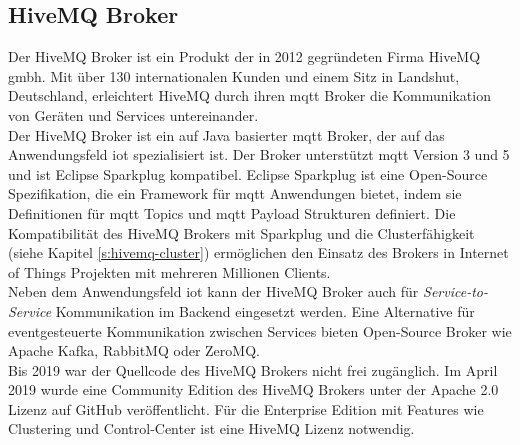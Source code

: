 \newpage

\subsection{HiveMQ Broker} \label{s:hivemq-broker}
Der HiveMQ Broker ist ein Produkt der in 2012 gegründeten Firma HiveMQ \acs{gmbh}. Mit über 130 internationalen Kunden und einem Sitz in Landshut, Deutschland, erleichtert HiveMQ durch ihren \ac{mqtt} Broker die Kommunikation von Geräten und Services untereinander.
\cite{HiveMQCompanya}
\\
Der HiveMQ Broker ist ein auf Java basierter \ac{mqtt} Broker, der auf das Anwendungsfeld \acl{iot} spezialisiert ist. Der Broker unterstützt \ac{mqtt} Version 3 und 5 und ist Eclipse Sparkplug kompatibel.
Eclipse Sparkplug ist eine Open-Source Spezifikation, die ein Framework für \ac{mqtt} Anwendungen bietet, indem sie Definitionen für \ac{mqtt} Topics und \ac{mqtt} Payload Strukturen definiert.
Die Kompatibilität des HiveMQ Brokers mit Sparkplug und die Clusterfähigkeit (siehe Kapitel \ref{s:hivemq-cluster}) ermöglichen den Einsatz des Brokers in Internet of Things Projekten mit mehreren Millionen Clients.
\cite{obermaierMQTTSparkplugEssentials}
\\
Neben dem Anwendungsfeld \ac{iot} kann der HiveMQ Broker auch für \textit{Service-to-Service} Kommunikation im Backend eingesetzt werden.
Eine Alternative für eventgesteuerte Kommunikation zwischen Services bieten Open-Source Broker wie Apache Kafka, RabbitMQ oder ZeroMQ.
\\
Bis 2019 war der Quellcode des HiveMQ Brokers nicht frei zugänglich. Im April 2019 wurde eine Community Edition des HiveMQ Brokers unter der Apache 2.0 Lizenz auf GitHub veröffentlicht. Für die Enterprise Edition mit Features wie Clustering und Control-Center ist eine HiveMQ Lizenz notwendig.

